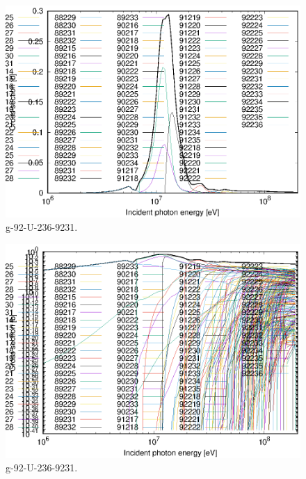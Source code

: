 \begin{figure}
 \includegraphics[width=\linewidth]{eps/g_92-U-236_9231.eps}
  \caption{g-92-U-236-9231.}
\end{figure}
\begin{figure}
 \includegraphics[width=\linewidth]{eps-log/g_92-U-236_9231.eps}
 \caption{g-92-U-236-9231.}
\end{figure}
\newpage \clearpage

